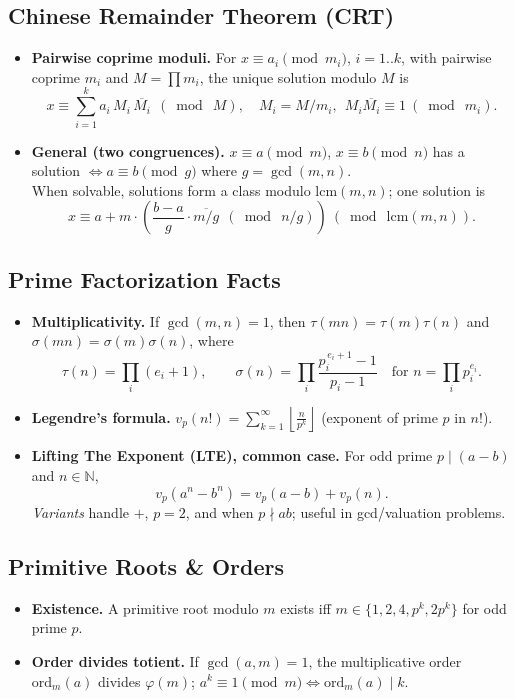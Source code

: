 \documentclass[9pt]{extarticle}
\begin{document}
\subsection{Chinese Remainder Theorem (CRT)}
\begin{itemize}
  \item \textbf{Pairwise coprime moduli.} For $x\equiv a_i\pmod{m_i}$, $i=1..k$, with pairwise coprime $m_i$ and $M=\prod m_i$, the unique solution modulo $M$ is
  \[
    x \equiv \sum_{i=1}^k a_i\,M_i\,\overline{M_i}\ \ (\bmod\ M),\quad M_i=M/m_i,\ \ M_i\overline{M_i}\equiv 1\ (\bmod\ m_i).
  \]
  \item \textbf{General (two congruences).} $x\equiv a\pmod m$, $x\equiv b\pmod n$ has a solution $\iff a\equiv b\pmod{g}$ where $g=\gcd(m,n)$. \\
        When solvable, solutions form a class modulo $\mathrm{lcm}(m,n)$; one solution is
  \[
    x \equiv a + m\cdot \left( \frac{b-a}{g}\cdot \overline{m/g} \ \ (\bmod\ n/g) \right)\ (\bmod\ \mathrm{lcm}(m,n)).
  \]
\end{itemize}

\subsection{Prime Factorization Facts}
\begin{itemize}
  \item \textbf{Multiplicativity.} If $\gcd(m,n)=1$, then $\tau(mn)=\tau(m)\tau(n)$ and $\sigma(mn)=\sigma(m)\sigma(n)$, where
  \[
    \tau(n)=\prod_{i}(e_i+1),\qquad
    \sigma(n)=\prod_{i}\frac{p_i^{\,e_i+1}-1}{p_i-1}\quad\text{for } n=\prod_i p_i^{e_i}.
  \]
  \item \textbf{Legendre's formula.} $v_p(n!)=\displaystyle\sum_{k=1}^{\infty}\left\lfloor \frac{n}{p^k}\right\rfloor$ (exponent of prime $p$ in $n!$).
  \item \textbf{Lifting The Exponent (LTE), common case.} For odd prime $p\mid (a-b)$ and $n\in\mathbb{N}$,
  \[
    v_p(a^n-b^n)=v_p(a-b)+v_p(n).
  \]
  \emph{Variants} handle $+$, $p=2$, and when $p\nmid ab$; useful in gcd/valuation problems.
\end{itemize}

\subsection{Primitive Roots \& Orders}
\begin{itemize}
  \item \textbf{Existence.} A primitive root modulo $m$ exists iff $m\in\{1,2,4,p^k,2p^k\}$ for odd prime $p$.
  \item \textbf{Order divides totient.} If $\gcd(a,m)=1$, the multiplicative order $\mathrm{ord}_m(a)$ divides $\varphi(m)$; $a^k\equiv 1\pmod m \iff \mathrm{ord}_m(a)\mid k$.
\end{itemize}
\end{document}
